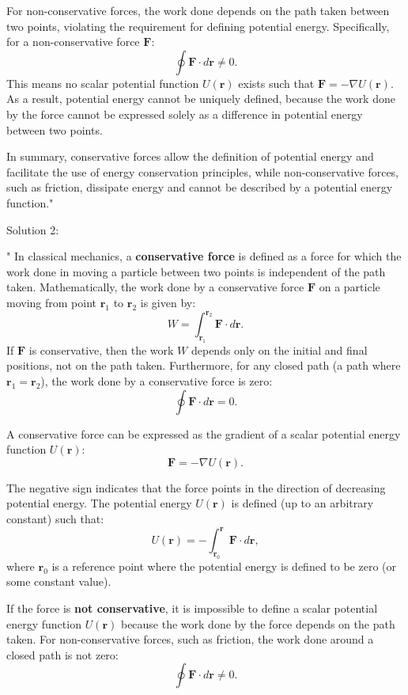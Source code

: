 For non-conservative forces, the work done depends on the path taken between two points, violating the requirement for defining potential energy. Specifically, for a non-conservative force $\mathbf{F}$:
\[
\oint \mathbf{F} \cdot d\mathbf{r} \neq 0.
\]
This means no scalar potential function $U(\mathbf{r})$ exists such that $\mathbf{F} = -\nabla U(\mathbf{r})$. As a result, potential energy cannot be uniquely defined, because the work done by the force cannot be expressed solely as a difference in potential energy between two points.

In summary, conservative forces allow the definition of potential energy and facilitate the use of energy conservation principles, while non-conservative forces, such as friction, dissipate energy and cannot be described by a potential energy function."

Solution 2: 

"
In classical mechanics, a \textbf{conservative force} is defined as a force for which the work done in moving a particle between two points is independent of the path taken. Mathematically, the work done by a conservative force $\mathbf{F}$ on a particle moving from point $\mathbf{r}_1$ to $\mathbf{r}_2$ is given by:
\[
W = \int_{\mathbf{r}_1}^{\mathbf{r}_2} \mathbf{F} \cdot d\mathbf{r}.
\]
If $\mathbf{F}$ is conservative, then the work $W$ depends only on the initial and final positions, not on the path taken. Furthermore, for any closed path (a path where $\mathbf{r}_1 = \mathbf{r}_2$), the work done by a conservative force is zero:
\[
\oint \mathbf{F} \cdot d\mathbf{r} = 0.
\]

A conservative force can be expressed as the gradient of a scalar potential energy function $U(\mathbf{r})$:
\[
\mathbf{F} = -\nabla U(\mathbf{r}).
\]

The negative sign indicates that the force points in the direction of decreasing potential energy. The potential energy $U(\mathbf{r})$ is defined (up to an arbitrary constant) such that:
\[
U(\mathbf{r}) = - \int_{\mathbf{r}_0}^{\mathbf{r}} \mathbf{F} \cdot d\mathbf{r},
\]
where $\mathbf{r}_0$ is a reference point where the potential energy is defined to be zero (or some constant value).

If the force is \textbf{not conservative}, it is impossible to define a scalar potential energy function $U(\mathbf{r})$ because the work done by the force depends on the path taken. For non-conservative forces, such as friction, the work done around a closed path is not zero:
\[
\oint \mathbf{F} \cdot d\mathbf{r} \neq 0.
\]

